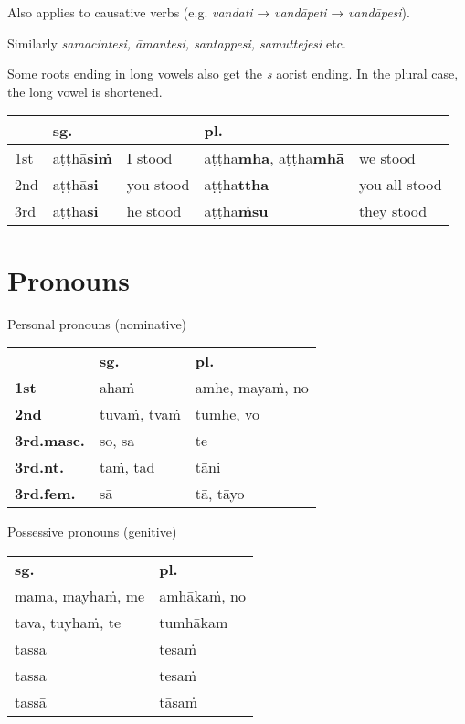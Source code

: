 \documentclass[a4paper]{memoir}
\begin{document}
Also applies to causative verbs (e.g. \emph{vandati} → \emph{vandāpeti} → \emph{vandāpesi}).

Similarly \emph{samacintesi, āmantesi, santappesi, samuttejesi} etc.

Some roots ending in long vowels also get the \emph{s} aorist ending. In the plural case, the long vowel is shortened.

\begin{center}
\begin{tabular}{lllll}
 & \textbf{sg.} &  & \textbf{pl.} & \\[0pt]
\hline
1st & aṭṭhā\textbf{siṁ} & I stood & aṭṭha\textbf{mha}, aṭṭha\textbf{mhā} & we stood\\[0pt]
2nd & aṭṭhā\textbf{si} & you stood & aṭṭha\textbf{ttha} & you all stood\\[0pt]
3rd & aṭṭhā\textbf{si} & he stood & aṭṭha\textbf{ṁsu} & they stood\\[0pt]
\end{tabular}
\end{center}

\clearpage

\section{Pronouns}
\label{sec:orgae32759}

{\centering\par
\begin{multicols}{2}

Personal pronouns (nominative)

\begin{center}
\begin{tabular}{lll}
 & \textbf{sg.} & \textbf{pl.}\\[0pt]
\textbf{1st} & ahaṁ & amhe, mayaṁ, no\\[0pt]
\textbf{2nd} & tuvaṁ, tvaṁ & tumhe, vo\\[0pt]
\textbf{3rd.masc.} & so, sa & te\\[0pt]
\textbf{3rd.nt.} & taṁ, tad & tāni\\[0pt]
\textbf{3rd.fem.} & sā & tā, tāyo\\[0pt]
\end{tabular}
\end{center}

\columnbreak

Possessive pronouns (genitive)

\begin{center}
\begin{tabular}{ll}
\textbf{sg.} & \textbf{pl.}\\[0pt]
mama, mayhaṁ, me & amhākaṁ, no\\[0pt]
tava, tuyhaṁ, te & tumhākam\\[0pt]
tassa & tesaṁ\\[0pt]
tassa & tesaṁ\\[0pt]
tassā & tāsaṁ\\[0pt]
\end{tabular}
\end{center}

\end{multicols}
\par}
\end{document}
